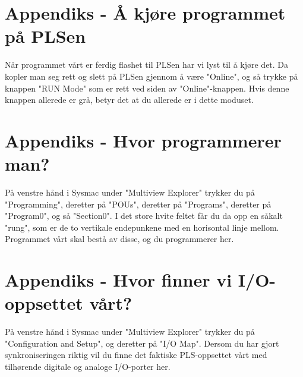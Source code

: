 \section{Appendiks - Å kjøre programmet på PLSen}
Når programmet vårt er ferdig flashet til PLSen har vi lyst til å kjøre det. Da kopler man seg rett og slett på PLSen gjennom å være "Online", og så trykke på knappen "RUN Mode" som er rett ved siden av "Online"-knappen. Hvis denne knappen allerede er grå, betyr det at du allerede er i dette moduset.

\section{Appendiks - Hvor programmerer man?}
På venstre hånd i Sysmac under "Multiview Explorer" trykker du på "Programming", deretter på "POUs", deretter på "Programs", deretter på "Program0", og så "Section0". I det store hvite feltet får du da opp en såkalt "rung", som er de to vertikale endepunkene med en horisontal linje mellom. Programmet vårt skal bestå av disse, og du programmerer her.

\section{Appendiks - Hvor finner vi I/O-oppsettet vårt?}
På venstre hånd i Sysmac under "Multiview Explorer" trykker du på "Configuration and Setup", og deretter på "I/O Map". Dersom du har gjort synkroniseringen riktig vil du finne det faktiske PLS-oppsettet vårt med tilhørende digitale og analoge I/O-porter her.